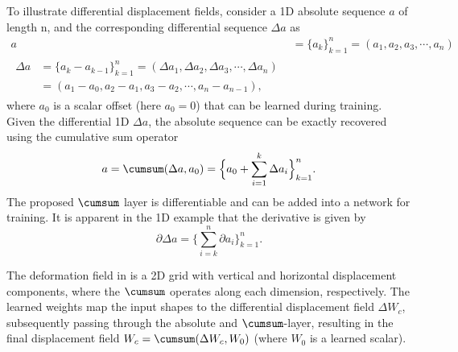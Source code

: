 \documentclass[acmtog,timestamp]{acmart}%
\begin{document}
To illustrate differential displacement fields, consider a 1D absolute sequence $a$ of length n, and the corresponding differential sequence $\Delta a$ as
\begin{subequations}
\begin{align}
a  & = \Big\{ a_k \Big\}_{k=1}^n  = ( a_1, a_2, a_3, \cdots, a_n ) \label{eq:oned_seq_abs}\\
\begin{split}
\Delta a & = \Big\{a_k - a_{k-1} \Big\}_{k=1}^n = ( \Delta a_1, \Delta a_2, \Delta a_3, \cdots, \Delta a_n )
\\
& = (a_1 - a_0, a_2 - a_1, a_3 - a_2,  \cdots, a_n - a_{n-1} ),
\end{split}
\label{eq:oned_seq_rel}
\end{align}
\end{subequations}
where $a_0$ is a scalar offset (here $a_0 = 0$) that can be learned during training. Given the differential 1D $\Delta a$, the absolute sequence can be exactly recovered using the cumulative sum operator
\begin{equation}
a = \cumsum( \Delta a ,a_0) = \Big\{ a_0 + \sum_{i=1}^k \Delta a_i \Big\}_{k=1}^n.
\label{eq:cumsum}
\end{equation}
The proposed $\cumsum$ layer is differentiable and can be added into a network for training. It is apparent in the 1D example that the derivative is given by
\begin{equation}
\partial \Delta a=\Big\{\sum_{i=k}^n \partial a_i  \Big\}_{k=1}^n.
\label{eq:cumsum_deriv}
\end{equation}%

The deformation field in \ourmethod{} is a 2D grid with vertical and horizontal displacement components, where the $\cumsum$ operates along each dimension, respectively. The learned \ourmethod{} weights map the input shapes to the differential displacement field $\Delta W_c$, subsequently passing through the absolute and $\cumsum$-layer, resulting in the final displacement field $W_c = \cumsum(\Delta W_c, W_0)$ (where $W_0$ is a learned scalar).
\end{document}
